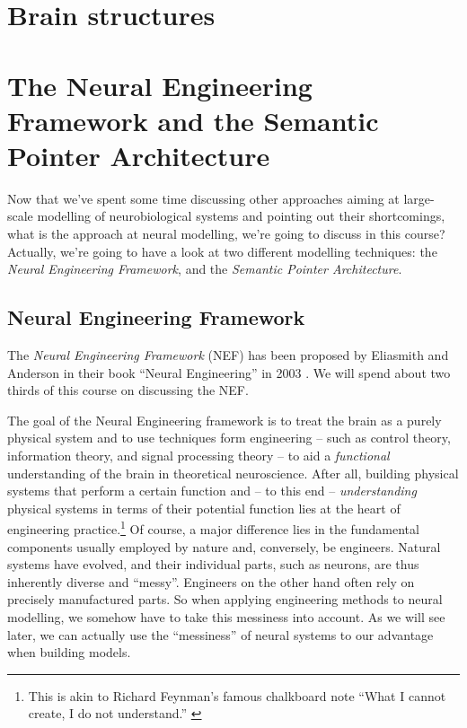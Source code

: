\documentclass[10pt,letterpaper,oneside]{article}
\begin{document}
\section{Brain structures}


\section{The Neural Engineering Framework and the Semantic Pointer Architecture}

Now that we've spent some time discussing other approaches aiming at large-scale modelling of neurobiological systems and pointing out their shortcomings, what is the approach at neural modelling, we're going to discuss in this course? Actually, we're going to have a look at two different modelling techniques: the \emph{Neural Engineering Framework}, and the \emph{Semantic Pointer Architecture}.

\subsection{Neural Engineering Framework}
The \emph{Neural Engineering Framework} (NEF) has been proposed by Eliasmith and Anderson in their book \enquote{Neural Engineering} in 2003 \cite{eliasmith2003neural}. We will spend about two thirds of this course on discussing the NEF.

The goal of the Neural Engineering framework is to treat the brain as a purely physical system and to use techniques form engineering -- such as control theory, information theory, and signal processing theory -- to aid a \emph{functional} understanding of the brain in theoretical neuroscience. After all, building physical systems that perform a certain function and -- to this end -- \emph{understanding} physical systems in terms of their potential function lies at the heart of engineering practice.\footnote{This is akin to Richard Feynman's famous chalkboard note \enquote{What I cannot create, I do not understand.} \cite{richard1988richard}} Of course, a major difference lies in the fundamental components usually employed by nature and, conversely, be engineers. Natural systems have evolved, and their individual parts, such as neurons, are thus inherently diverse and \enquote{messy}. Engineers on the other hand often rely on precisely manufactured parts. So when applying engineering methods to neural modelling, we somehow have to take this messiness into account. As we will see later, we can actually use the \enquote{messiness} of neural systems to our advantage when building models.
\end{document}
